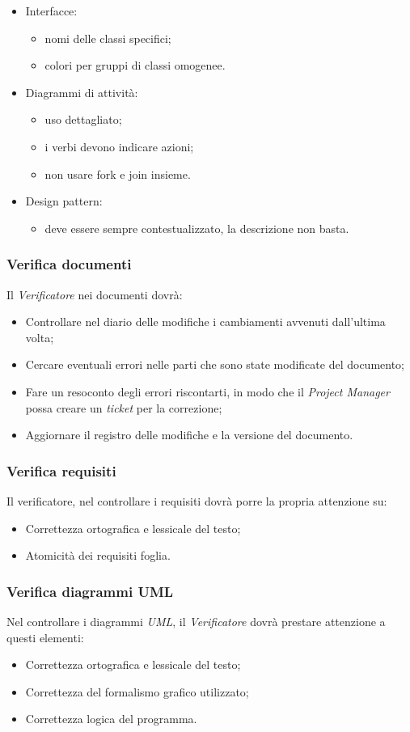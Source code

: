 \documentclass[12pt,a4paper,titlepage]{article}
\begin{document}
\begin{itemize}
\item Interfacce:
	\begin{itemize}
		\item nomi delle classi specifici;
		\item colori per gruppi di classi omogenee.
	\end{itemize}
\item Diagrammi di attività:
	\begin{itemize}
		\item uso dettagliato;
		\item i verbi devono indicare azioni;
		\item non usare fork e join insieme.
	\end{itemize}
\item Design pattern:
	\begin{itemize}
		\item deve essere sempre contestualizzato, la descrizione non basta.
	\end{itemize}
\end{itemize}
\subsubsection{Verifica documenti}
Il \textit{Verificatore} nei documenti dovrà:
\begin{itemize}
	\item Controllare nel diario delle modifiche i cambiamenti avvenuti dall'ultima volta;
	\item Cercare eventuali errori nelle parti che sono state modificate del documento;
	\item Fare un resoconto degli errori riscontarti, in modo che il \textit{Project Manager} possa creare un \textit{ticket} per la correzione;
	\item Aggiornare il registro delle modifiche e la versione del documento.
\end{itemize}
\subsubsection{Verifica requisiti}
Il verificatore, nel controllare i requisiti dovrà porre la propria attenzione su:
\begin{itemize}
	\item Correttezza ortografica e lessicale del testo;
	\item Atomicità dei requisiti foglia.
\end{itemize}
\subsubsection{Verifica diagrammi UML}
Nel controllare i diagrammi \textit{UML}, il \textit{Verificatore} dovrà prestare attenzione a questi elementi:
\begin{itemize}
	\item Correttezza ortografica e lessicale del testo;
	\item Correttezza del formalismo grafico utilizzato;
	\item Correttezza logica del programma.
\end{itemize}
	
\end{document}

